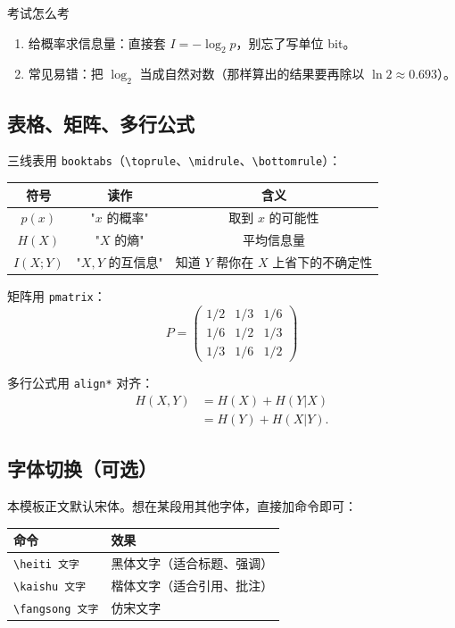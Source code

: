 \documentclass[11pt,a4paper,fontset=none]{ctexart}
\providecommand{\heiti}{\CJKfamily{zhhei}}     %
\providecommand{\kaishu}{\CJKfamily{zhkai}}    %
\providecommand{\fangsong}{\CJKfamily{zhfs}}   %
\newcommand{\Hx}[1]{H\!\left(#1\right)}       %
\newcommand{\I}[1]{I\!\left(#1\right)}        %
\newcommand{\lb}{\log_{2}}                    %
\begin{document}
\begin{exam}{考试怎么考}
\begin{enumerate}[leftmargin=1.6em,itemsep=1pt,topsep=2pt]
  \item 给概率求信息量：直接套 $I=-\lb p$，别忘了写单位 bit。
  \item 常见易错：把 $\lb$ 当成自然对数（那样算出的结果要再除以 $\ln2\approx0.693$）。
\end{enumerate}
\end{exam}

\subsection{表格、矩阵、多行公式}

三线表用 \texttt{booktabs}（\verb|\toprule|、\verb|\midrule|、\verb|\bottomrule|）：
\begin{center}
\renewcommand{\arraystretch}{1.25}
\begin{tabular}{c|c|c}
\toprule
符号 & 读作 & 含义\\
\midrule
$p(x)$ & "$x$ 的概率" & 取到 $x$ 的可能性\\
$\Hx{X}$ & "$X$ 的熵" & 平均信息量\\
$\I{X;Y}$ & "$X,Y$ 的互信息" & 知道 $Y$ 帮你在 $X$ 上省下的不确定性\\
\bottomrule
\end{tabular}
\end{center}

矩阵用 \texttt{pmatrix}：
\[
P=\begin{pmatrix}1/2 & 1/3 & 1/6\\[2pt] 1/6 & 1/2 & 1/3\\[2pt] 1/3 & 1/6 & 1/2\end{pmatrix}
\]

多行公式用 \texttt{align*} 对齐：
\begin{align*}
\Hx{X,Y}&=\Hx{X}+\Hx{Y|X}\\
&=\Hx{Y}+\Hx{X|Y}.
\end{align*}

\subsection{字体切换（可选）}

本模板正文默认宋体。想在某段用其他字体，直接加命令即可：

\begin{center}
\begin{tabular}{ll}
\toprule
命令 & 效果\\
\midrule
\verb|\heiti 文字| & \heiti 黑体文字（适合标题、强调）\\
\verb|\kaishu 文字| & \kaishu 楷体文字（适合引用、批注）\\
\verb|\fangsong 文字| & \fangsong 仿宋文字\\
\bottomrule
\end{tabular}
\end{center}
\end{document}
